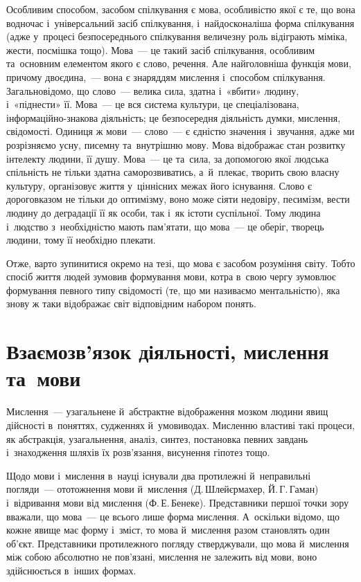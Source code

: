 \documentclass[a5paper,oneside,DIV=12,12pt,headings=small]{scrartcl}
\begin{document}
		Особливим способом, засобом спілкування є мова, особливістю якої є те, що вона водночас і~універсальний засіб спілкування, і~найдосконаліша форма спілкування (адже у~процесі безпосереднього спілкування величезну роль відіграють міміка, жести, посмішка тощо). Мова~— це такий засіб спілкування, особливим та~основним елементом якого є слово, речення. Але найголовніша функція мови, причому двоєдина,~— вона є знаряддям мислення і~способом спілкування. Загальновідомо, що слово~— велика сила, здатна і~«вбити» людину, і~«піднести» її. Мова~— це вся система культури, це спеціалізована, інформаційно-знакова діяльність; це безпосередня діяльність думки, мислення, свідомості. Одиниця ж мови~— слово~— є єдністю значення і~звучання, адже ми розрізняємо усну, писемну та~внутрішню мову. Мова відображає стан розвитку інтелекту людини, її душу. Мова~— це та~сила, за допомогою якої людська спільність не тільки здатна саморозвиватись, а~й~плекає, творить свою власну культуру, організовує життя у~ціннісних межах його існування. Слово є дороговказом не тільки до оптимізму, воно може сіяти недовіру, песимізм, вести людину до деградації її як особи, так і~як істоти суспільної. Тому людина і~людство з~необхідністю мають пам'\-я\-та\-ти, що мова~— це оберіг, творець людини, тому її необхідно плекати.

		Отже, варто зупинитися окремо на тезі, що мова є засобом розуміння світу. Тобто спосіб життя людей зумовив формування мови, котра в~свою чергу зумовлює формування певного типу свідомості (те, що ми називаємо ментальністю), яка знову ж таки відображає світ відповідним набором понять.

	\section{Взаємозв'язок діяльності, мислення та~мови}
		Мислення~— узагальнене й~абстрактне відображення мозком людини явищ дійсності в~поняттях, судженнях й~умовиводах. Мисленню властиві такі процеси, як абстракція, узагальнення, аналіз, синтез, постановка певних завдань і~знаходження шляхів їх роз\-в'я\-зан\-ня, висунення гіпотез тощо.

		Щодо мови і~мислення в~науці існували два протилежні й~неправильні погляди~— ототожнення мови й~мислення (Д.\,Шлейєрмахер, Й.\,Г.\,Гаман) і~відривання мови від мислення (Ф.\,Е.\,Бенеке). Представники першої точки зору вважали, що мова~— це всього лише форма мислення. А~оскільки відомо, що кожне явище має форму і~зміст, то мова й~мислення разом становлять один об'\-єкт. Представники протилежного погляду стверджували, що мова й~мислення між собою абсолютно не пов'\-я\-за\-ні, мислення не залежить від мови, воно здійснюється в~інших формах.
\end{document}
